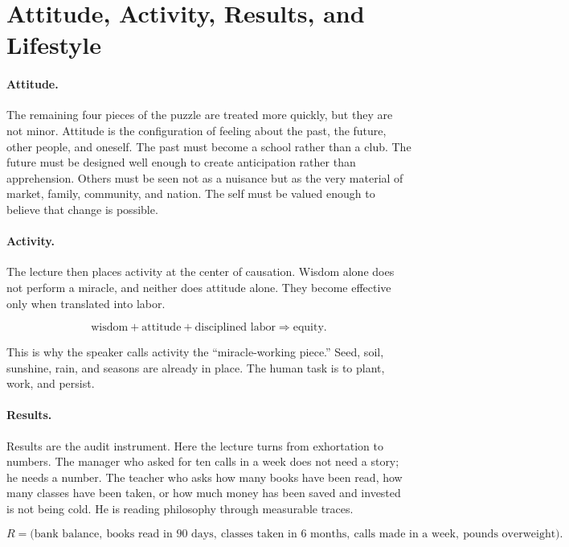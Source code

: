 \section{Attitude, Activity, Results, and Lifestyle}

\paragraph{Attitude.}
The remaining four pieces of the puzzle are treated more quickly, but they are not minor. Attitude is the configuration of feeling about the past, the future, other people, and oneself. The past must become a school rather than a club. The future must be designed well enough to create anticipation rather than apprehension. Others must be seen not as a nuisance but as the very material of market, family, community, and nation. The self must be valued enough to believe that change is possible.

\paragraph{Activity.}
The lecture then places activity at the center of causation. Wisdom alone does not perform a miracle, and neither does attitude alone. They become effective only when translated into labor.

\begin{equation}
\text{wisdom}+\text{attitude}+\text{disciplined labor}\Rightarrow \text{equity}.
\end{equation}

This is why the speaker calls activity the ``miracle-working piece.'' Seed, soil, sunshine, rain, and seasons are already in place. The human task is to plant, work, and persist.

\paragraph{Results.}
Results are the audit instrument. Here the lecture turns from exhortation to numbers. The manager who asked for ten calls in a week does not need a story; he needs a number. The teacher who asks how many books have been read, how many classes have been taken, or how much money has been saved and invested is not being cold. He is reading philosophy through measurable traces.

\begin{equation}
R=\bigl(\text{bank balance},\ \text{books read in 90 days},\ \text{classes taken in 6 months},\ \text{calls made in a week},\ \text{pounds overweight}\bigr).
\end{equation}

